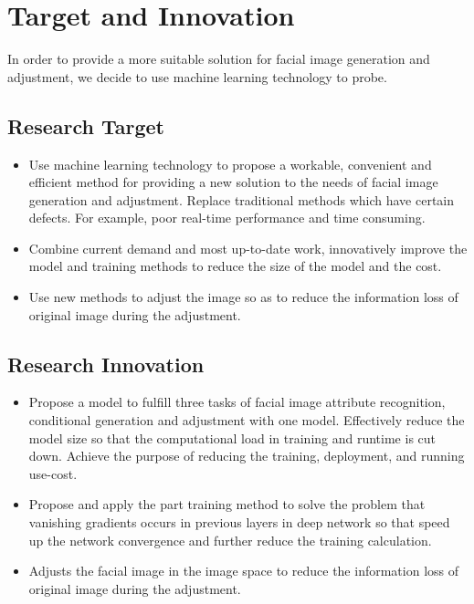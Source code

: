 \section{Target and Innovation}

In order to provide a more suitable solution for facial image generation and adjustment,
    we decide to use machine learning technology to probe.

\subsection{Research Target}
\begin{itemize}
\item Use machine learning technology to propose a workable,
    convenient and efficient method for providing a new solution to the needs of facial image generation and adjustment.
    Replace traditional methods which have certain defects. For example, poor real-time performance and time consuming.
\item Combine current demand and most up-to-date work, 
    innovatively improve the model and training methods to reduce the size of the model and the cost.
\item Use new methods to adjust the image so as to reduce the information loss of original image during the adjustment.
\end{itemize}
\subsection{Research Innovation}
\begin{itemize}
\item Propose a model to fulfill three tasks of facial image attribute recognition,
    conditional generation and adjustment with one model.
    Effectively reduce the model size so that the computational load in training and runtime is cut down.
    Achieve the purpose of reducing the training, deployment, and running use-cost.
\item Propose and apply the part training method to solve the problem that vanishing gradients occurs in previous layers in deep network so that speed up the network convergence and further reduce the training calculation.

\item Adjusts the facial image in the image space to reduce the information loss of original image during the adjustment.
\end{itemize}